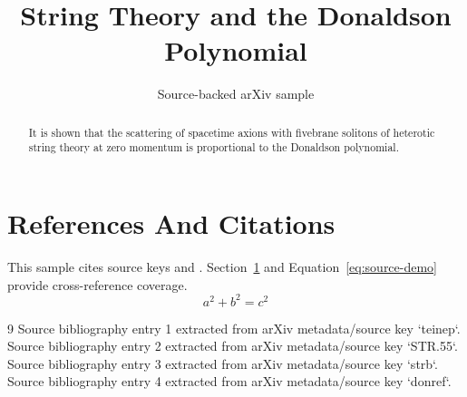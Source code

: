 \documentclass[11pt]{article}
\title{String Theory and the Donaldson Polynomial}
\author{Source-backed arXiv sample}
\date{}
\begin{document}
\maketitle
\begin{abstract}
It is shown that the scattering of spacetime axions with fivebrane solitons of heterotic string theory at zero momentum is proportional to the Donaldson polynomial.
\end{abstract}
\section{References And Citations}
\label{sec:refs}
This sample cites source keys \cite{teinep} and \cite{STR.55}. Section~\ref{sec:refs} and Equation~\ref{eq:source-demo} provide cross-reference coverage.
\begin{equation}
\label{eq:source-demo}
a^2 + b^2 = c^2
\end{equation}
\begin{thebibliography}{9}
 Source bibliography entry 1 extracted from arXiv metadata/source key `teinep`.
 Source bibliography entry 2 extracted from arXiv metadata/source key `STR.55`.
 Source bibliography entry 3 extracted from arXiv metadata/source key `strb`.
 Source bibliography entry 4 extracted from arXiv metadata/source key `donref`.
\end{thebibliography}
\end{document}
